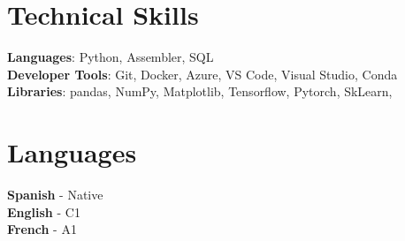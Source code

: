 \documentclass[letterpaper,11pt]{article}
\begin{document}
%
\section{Technical Skills}
 \begin{itemize}[leftmargin=0.15in, label={}]
    \small{\item{
     \textbf{Languages}{: Python, Assembler, SQL} \\
     \textbf{Developer Tools}{: Git, Docker, Azure, VS Code, Visual Studio, Conda} \\
     \textbf{Libraries}{: pandas, NumPy, Matplotlib, Tensorflow, Pytorch, SkLearn, }
    }}
 \end{itemize}

\section{Languages}
 \begin{itemize}[leftmargin=0.15in, label={}]
    \small{\item{
     \textbf{Spanish}{ - Native} \\
     \textbf{English}{ - C1} \\
     \textbf{French}{ - A1} \\
    }}
 \end{itemize}


\end{document}
